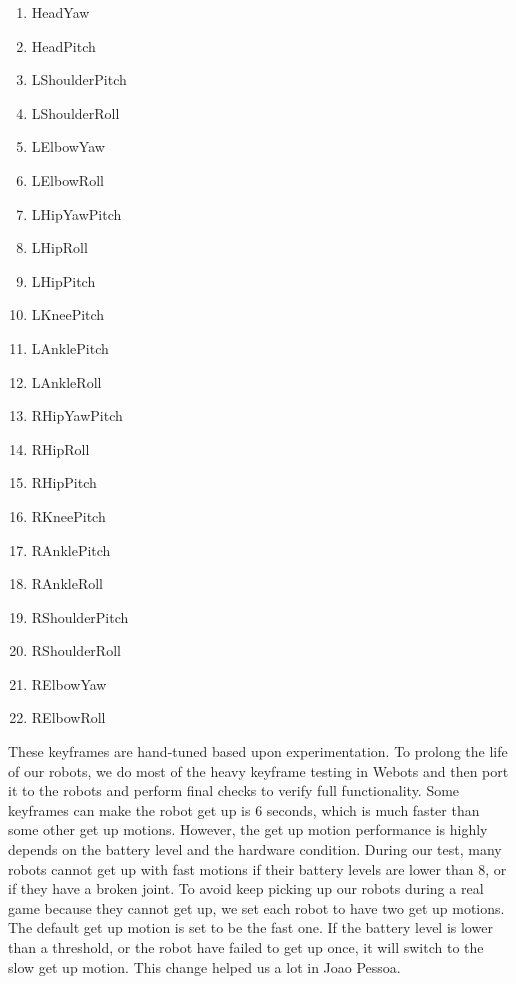 \documentclass{article}
\begin{document}
	\begin{multicols}{3}
		\begin{enumerate}
			\item HeadYaw
  			\item HeadPitch
	  		\item LShoulderPitch
		  	\item LShoulderRoll
			\item LElbowYaw
  			\item LElbowRoll
	  		\item LHipYawPitch
		  	\item LHipRoll
			\item LHipPitch
  			\item LKneePitch
	  		\item LAnklePitch
		  	\item LAnkleRoll
			\item RHipYawPitch
  			\item RHipRoll
	  		\item RHipPitch
		  	\item RKneePitch
			\item RAnklePitch
  			\item RAnkleRoll
	  		\item RShoulderPitch
		  	\item RShoulderRoll
			\item RElbowYaw
  			\item RElbowRoll
		\end{enumerate}
	\end{multicols}

	These keyframes are hand-tuned based upon experimentation. To prolong the life of our robots, we do most of the heavy keyframe testing in Webots and then port it to the robots and perform final checks to verify full functionality. Some keyframes can make the robot get up is 6 seconds, which is much faster than some other get up motions. However, the get up motion performance is highly depends on the battery level and the hardware condition. During our test, many robots cannot get up with fast motions if their battery levels are lower than 8, or if they have a broken joint. To avoid keep picking up our robots during a real game because they cannot get up, we set each robot to have two get up motions. The default get up motion is set to be the fast one. If the battery level is lower than a threshold, or the robot have failed to get up once, it will switch to the slow get up motion. This change helped us a lot in Joao Pessoa. 
\end{document}
